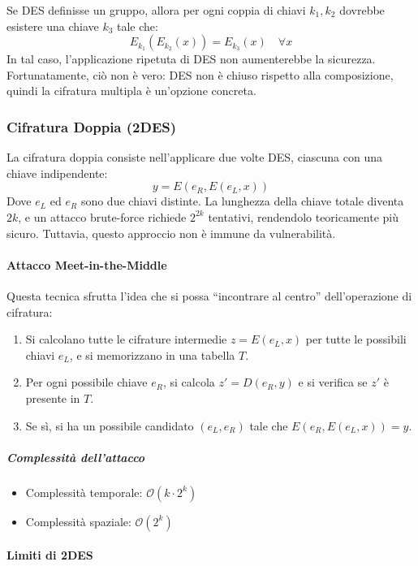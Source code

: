 \documentclass{report}
\begin{document}
Se DES definisse un gruppo, allora per ogni coppia di chiavi $k_1, k_2$ dovrebbe esistere una chiave $k_3$ tale che:
\[
E_{k_1}(E_{k_2}(x)) = E_{k_3}(x) \quad \forall x
\]
In tal caso, l'applicazione ripetuta di DES non aumenterebbe la sicurezza. Fortunatamente, ciò non è vero: DES non è chiuso rispetto alla composizione, quindi la cifratura multipla è un’opzione concreta.

\subsubsection{Cifratura Doppia (2DES)}

La cifratura doppia consiste nell'applicare due volte DES, ciascuna con una chiave indipendente:
\[
y = E(e_R, E(e_L, x))
\]
Dove $e_L$ ed $e_R$ sono due chiavi distinte. La lunghezza della chiave totale diventa $2k$, e un attacco brute-force richiede $2^{2k}$ tentativi, rendendolo teoricamente più sicuro. Tuttavia, questo approccio non è immune da vulnerabilità.

\paragraph{Attacco Meet-in-the-Middle}

Questa tecnica sfrutta l'idea che si possa ``incontrare al centro'' dell’operazione di cifratura:
\begin{enumerate}
    \item Si calcolano tutte le cifrature intermedie $z = E(e_L, x)$ per tutte le possibili chiavi $e_L$, e si memorizzano in una tabella $T$.
    \item Per ogni possibile chiave $e_R$, si calcola $z' = D(e_R, y)$ e si verifica se $z'$ è presente in $T$.
    \item Se sì, si ha un possibile candidato $(e_L, e_R)$ tale che $E(e_R, E(e_L, x)) = y$.
\end{enumerate}

\subparagraph{Complessità dell'attacco}

\begin{itemize}
    \item Complessità temporale: $\mathcal{O}(k \cdot 2^k)$
    \item Complessità spaziale: $\mathcal{O}(2^k)$
\end{itemize}

\paragraph{Limiti di 2DES}
\end{document}
